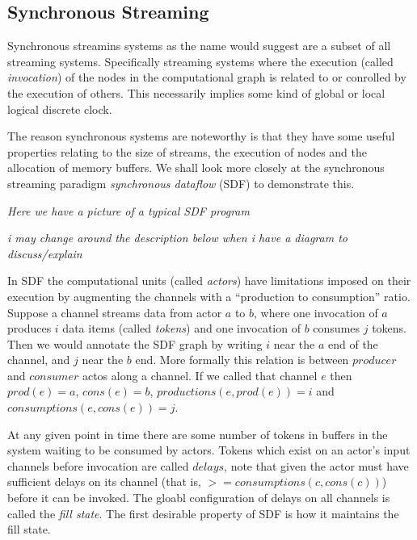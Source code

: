 \subsection{Synchronous Streaming}
\label{BACK_SYNC}

Synchronous streamins systems as the name would suggest are a subset of all streaming systems.
Specifically streaming systems where the execution (called {\em invocation}) of the nodes in the computational graph is related to or conrolled by the execution of others.
This necessarily implies some kind of global or local logical discrete clock.

The reason synchronous systems are noteworthy is that they have some useful properties relating to the size of streams, the execution of nodes and the allocation of memory buffers.
We shall look more closely at the synchronous streaming paradigm {\em synchronous dataflow} (SDF) to demonstrate this.

{\em Here we have a picture of a typical SDF program}

{\em i may change around the description below when i have a diagram to discuss/explain}

In SDF the computational units (called {\em actors}) have limitations imposed on their execution by augmenting the channels with a ``production to consumption'' ratio.
Suppose a channel streams data from actor $a$ to $b$, where one invocation of $a$ produces $i$ data items (called {\em tokens}) and one invocation of $b$ consumes $j$ tokens.
Then we would annotate the SDF graph by writing $i$ near the $a$ end of the channel, and $j$ near the $b$ end.
More formally this relation is between $producer$ and $consumer$ actos along a channel.
If we called that channel $e$ then $prod(e) = a$, $cons(e) = b$, $productions(e, prod(e)) = i$ and $consumptions(e, cons(e)) = j$.

At any given point in time there are some number of tokens in buffers in the system waiting to be consumed by actors.
Tokens which exist on an actor's input channels before invocation are called $delays$, note that given the actor must have sufficient delays on its channel (that is, $>= consumptions(c, cons(c))$) before it can be invoked.
The gloabl configuration of delays on all channels is called the {\em fill state}.
The first desirable property of SDF is how it maintains the fill state.

